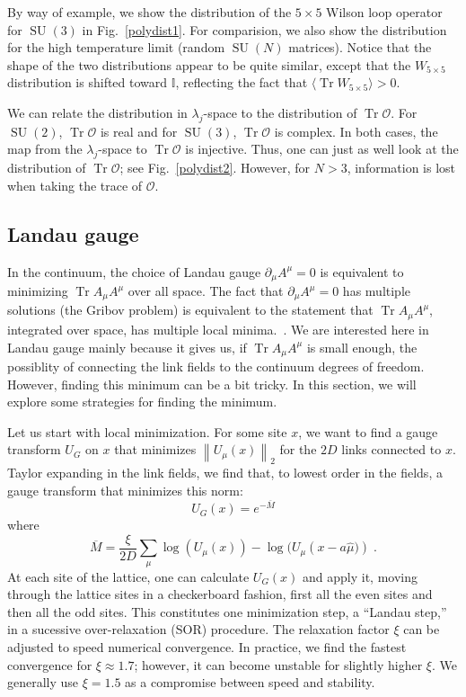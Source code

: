 \documentclass[preprint,aps,prd]{revtex4-2}
\newcommand{\be}{\begin{equation}}
\newcommand{\eq}{\end{equation}}
\newcommand{\orelax}{\xi}
\DeclareMathOperator{\SU}{SU}
\DeclareMathOperator{\Tr}{Tr}
\begin{document}
By way of example, we show the distribution of the
$5\times5$ Wilson loop operator for $\SU(3)$ in Fig.~\ref{polydist1}.
For comparision, we also show the distribution for
the high temperature limit (random $\SU(N)$ matrices).
Notice that the shape of the two distributions appear to
be quite similar, except that the $W_{5\times5}$ distribution
is shifted toward $\mathbb{I}$, reflecting the fact that
$\langle\Tr W_{5\times5}\rangle >0$.

We can relate the distribution in $\lambda_j$-space to the
distribution of $\Tr\mathcal{O}$.
For $\SU(2)$, $\Tr \mathcal{O}$ is real and for $\SU(3)$, $\Tr \mathcal{O}$
is complex.  In both cases, the map from the $\lambda_j$-space to
$\Tr \mathcal{O}$ is injective.  Thus, one can just as well look at the
distribution of $\Tr \mathcal{O}$; see Fig.~\ref{polydist2}.
However, for $N>3$, information is lost when taking the trace
of $\mathcal{O}$.

\subsection{Landau gauge}

In the continuum, the choice of Landau gauge $\partial_\mu A^\mu = 0$
is equivalent to minimizing $\Tr A_\mu A^\mu$ over all space.  The fact that
$\partial_\mu A^\mu = 0$ has multiple solutions (the Gribov problem) is
equivalent to the statement that $\Tr A_\mu A^\mu$, integrated over space,
has multiple local minima.~\cite{maas_more_2009}.
We are interested here in Landau gauge mainly
because it gives us, if $\Tr A_\mu A^\mu$ is small enough, the
possiblity of connecting the
link fields to the continuum degrees of freedom.
However, finding this minimum can be a bit tricky.  In this
section, we will explore some strategies for finding the minimum.

Let us start with local minimization.
For some site $x$, we want to find a gauge transform $U_G$ on $x$
that minimizes $\left\lVert U_\mu(x) \right\rVert_2$ for the $2D$
links connected to $x$.  Taylor expanding in the link fields,
we find that, to lowest order in the fields, a gauge transform
that minimizes this norm:
%
\be
          U_G(x) = e^{- \overline{M}}
\eq
where
\be
   \overline{M} = \frac{\orelax}{2 D} \sum_\mu \log\left(U_\mu(x)\right) -
   \log(U_\mu\left(x-a \hat{\mu})\right)  \; . \label{landau}
\eq
At each site of the lattice, one can calculate $U_G(x)$ and apply it,
moving through the lattice sites in a checkerboard fashion,
first all the even sites and then all the odd sites.
This constitutes one minimization step, a ``Landau step,'' in a
sucessive over-relaxation (SOR) procedure.
The relaxation factor $\orelax$ can be adjusted to speed numerical
convergence.
In practice, we find the fastest convergence for $\orelax \approx 1.7$;
however, it can become unstable for slightly higher $\orelax$.
We generally use $\orelax=1.5$ as a compromise between speed and stability.
\end{document}
